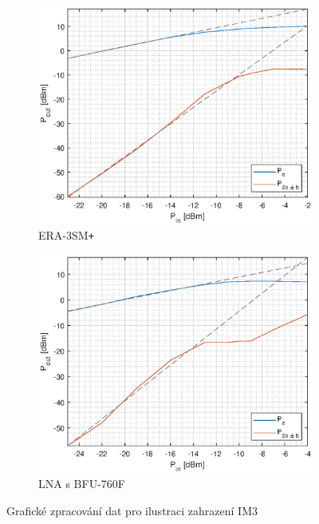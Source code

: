 \documentclass[11pt,a4paper]{article}
\newcommand{\plus}{{\texttt{+}}}
\begin{document}
\begin{figure}[!ht]
    \centering
\begin{subfigure}{0.45\textwidth}
    \centering
    \includegraphics[width=\textwidth]{src/ERA3SM-intercept.eps}
    \caption{ERA-3SM\plus}
    \label{fig:ERA3SM-intercept}
\end{subfigure}
\begin{subfigure}{0.45\textwidth}
    \centering
    \includegraphics[width=\textwidth]{src/BFU760F-intercept.eps}
    \caption{LNA s BFU-760F}
    \label{fig:BFU760F-intercept}
\end{subfigure}
\caption{Grafické zpracování dat pro ilustraci zahrazení IM3}
\end{figure}
\end{document}
